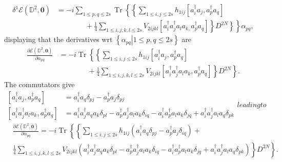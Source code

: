 \documentclass[aps,preprint]{revtex4}%
\begin{document}
\begin{align}
\delta^{1}\mathcal{E}\left(  \mathbb{D}^{2},\bm{0}\right)   &  =-i\sum_{1\leq
p,q\leq2s}\operatorname{Tr}\left\{  \left\{  \sum_{1\leq i,j\leq2s}%
h_{1ij}\left[  a_{i}^{\dagger}a_{j},a_{p}^{\dagger}a_{q}\right]  \right.
\right. \nonumber\\
&  \qquad\qquad+\left.  \left.  \frac{1}{4}\sum_{1\leq i,j,k,l\leq2s}%
V_{2ijkl}\left[  a_{i}^{\dagger}a_{j}^{\dagger}a_{l}a_{k,}a_{p}^{\dagger}%
a_{q}\right]  \right\}  \left.  D^{2N}\right\}  \right\}  \alpha_{pq},
\end{align}
displaying that the derivatives wrt $\left\{  \left.  \alpha_{pq}\right\vert
1\leq p,q\leq2s\right\}  $ are
\begin{align}
\frac{\partial\mathcal{E}\left(  \mathbb{D}^{2},\bm{0}\right)  }%
{\partial\alpha_{pq}}  &  =-i\operatorname{Tr}\left\{  \left\{  \sum_{1\leq
i,j\leq2s}h_{1ij}\left[  a_{i}^{\dagger}a_{j},a_{p}^{\dagger}a_{q}\right]
\right.  \right. \nonumber\\
&  \qquad\qquad+\left.  \left.  \frac{1}{4}\sum_{1\leq i,j,k,l\leq2s}%
V_{2ijkl}\left[  a_{i}^{\dagger}a_{j}^{\dagger}a_{l}a_{k},a_{p}^{\dagger}%
a_{q}\right]  \right\}  D^{2N}\right\}  .
\end{align}
The commutators give
\begin{subequations}
\begin{align}
\left[  a_{i}^{\dagger}a_{j},a_{p}^{\dagger}a_{q}\right]   &  =a_{i}^{\dagger
}a_{q}\delta_{pj}-a_{p}^{\dagger}a_{j}\delta_{pj}\\
\left[  a_{i}^{\dagger}a_{j}^{\dagger}a_{l}a_{k},a_{p}^{\dagger}a_{q}\right]
&  =a_{i}^{\dagger}a_{j}^{\dagger}a_{q}a_{k}\delta_{pl}-a_{p}^{\dagger}%
a_{j}^{\dagger}a_{l}a_{k}\delta_{iq}-a_{i}^{\dagger}a_{p}^{\dagger}a_{l}%
a_{k}\delta_{jq}+a_{i}^{\dagger}a_{j}^{\dagger}a_{l}a_{q}\delta_{pk}%
\end{align}
leading to
\end{subequations}
\begin{align}
&  \frac{\partial\mathcal{E}\left(  \mathbb{D}^{2},\bm{0}\right)  }%
{\partial\alpha_{pq}}=-i\operatorname{Tr}\left\{  \left\{  \sum_{1\leq
i,j\leq2s}h_{1ij}\left(  a_{i}^{\dagger}a_{q}\delta_{pj}-a_{p}^{\dagger}%
a_{j}\delta_{iq}\right)  \right.  \right.  +\nonumber\\
&  \left.  \left.  \frac{1}{4}\sum_{1\leq i,j,k,l\leq2s}V_{2ijkl}\left(
a_{i}^{\dagger}a_{j}^{\dagger}a_{q}a_{k}\delta_{pl}-a_{p}^{\dagger}%
a_{j}^{\dagger}a_{l}a_{k}\delta_{iq}-a_{i}^{\dagger}a_{p}^{\dagger}a_{l}%
a_{k}\delta_{jq}+a_{i}^{\dagger}a_{j}^{\dagger}a_{l}a_{q}\delta_{pk}\right)
\right\}  D^{2N}\right\}  .
\end{align}
\end{document}
